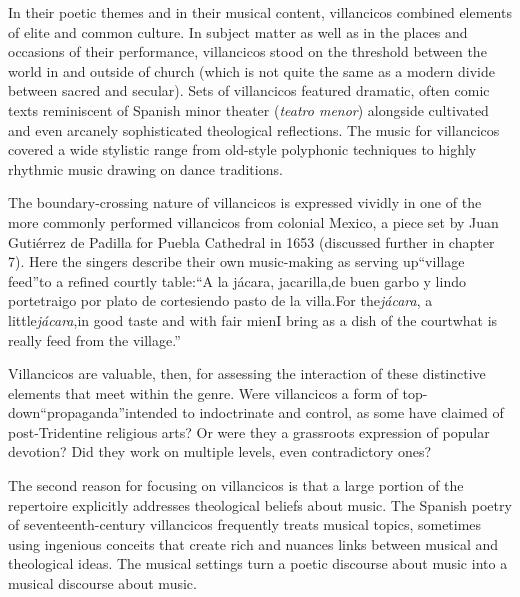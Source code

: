\documentclass{memoir}
\begin{document}
In their poetic themes and in their musical content, villancicos combined elements of elite and common culture. In subject matter as well as in the places and occasions of their performance, villancicos stood on the threshold between the world in and outside of church (which is not quite the same as a modern divide between sacred and secular). Sets of villancicos featured dramatic, often comic texts reminiscent of Spanish minor theater (\emph{teatro menor}) alongside cultivated and even arcanely sophisticated theological reflections. The music for villancicos covered a wide stylistic range from old-style polyphonic techniques to highly rhythmic music drawing on dance traditions.

The boundary-crossing nature of villancicos is expressed vividly in one of the more commonly performed villancicos from colonial Mexico, a piece set by Juan Gutiérrez de Padilla for Puebla Cathedral in 1653 (discussed further in chapter 7). Here the singers describe their own music-making as serving up\enquote{village feed}to a refined courtly table:\enquote{A la jácara, jacarilla,de buen garbo y lindo portetraigo por plato de cortesiendo pasto de la villa.For the\emph{jácara}, a little\emph{jácara},in good taste and with fair mienI bring as a dish of the courtwhat is really feed from the village.}

Villancicos are valuable, then, for assessing the interaction of these distinctive elements that meet within the genre. Were villancicos a form of top-down\enquote{propaganda}intended to indoctrinate and control, as some have claimed of post-Tridentine religious arts? Or were they a grassroots expression of popular devotion? Did they work on multiple levels, even contradictory ones?

The second reason for focusing on villancicos is that a large portion of the repertoire explicitly addresses theological beliefs about music. The Spanish poetry of seventeenth-century villancicos frequently treats musical topics, sometimes using ingenious conceits that create rich and nuances links between musical and theological ideas. The musical settings turn a poetic discourse about music into a musical discourse about music.
\end{document}
